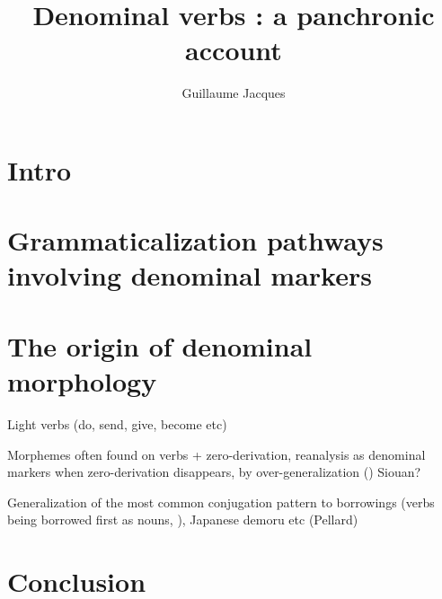 \documentclass[oldfontcommands,oneside,a4paper,11pt]{article}
\begin{document}
 
 \title{Denominal verbs : a panchronic account}
\author{Guillaume Jacques}
\maketitle
\sloppy

\section{Intro}


\section{Grammaticalization pathways involving denominal markers}

\citet{jacques14antipassive}
\citet{jacques15causative}

\citet{jacques13tropative}
\citet{jacques12incorp}




\section{The origin of denominal morphology}

\begin{exe}
\item Light verbs (do, send, give, become etc)
\item Morphemes often found on verbs + zero-derivation, reanalysis as denominal markers when zero-derivation disappears, by over-generalization  (\citealt{heath98hermit}) Siouan?
\item Generalization of the most common conjugation pattern to borrowings (verbs being borrowed first as nouns, \citealt{wohlgemuth09verbal}), Japanese demoru etc (Pellard)
\end{exe}
\section{Conclusion}



 
\end{document}
